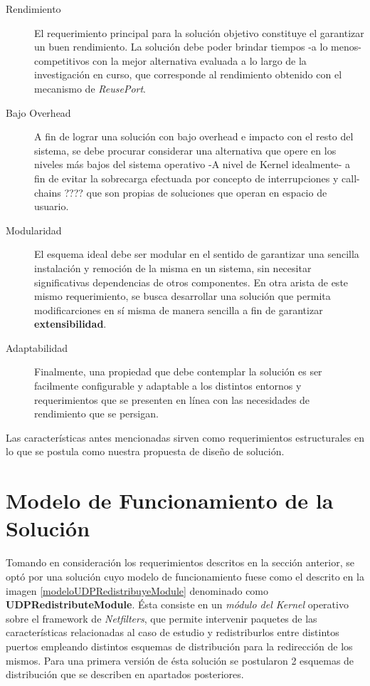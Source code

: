 \begin{description}
\item[Rendimiento] El requerimiento principal para la solución objetivo constituye el garantizar un buen rendimiento. La solución debe poder brindar tiempos -a lo menos- competitivos con la mejor alternativa evaluada a lo largo de la investigación en curso, que corresponde al rendimiento obtenido con el mecanismo de \emph{ReusePort}.
\item[Bajo Overhead] A fin de lograr una solución con bajo overhead e impacto con el resto del sistema, se debe procurar considerar una alternativa que opere en los niveles más bajos del sistema operativo -A nivel de Kernel idealmente- a fin de evitar la sobrecarga efectuada por concepto de interrupciones y call-chains ???? que son propias de soluciones que operan en espacio de usuario.
\item[Modularidad] El esquema ideal debe ser modular en el sentido de garantizar una sencilla instalación y remoción de la misma en un sistema, sin necesitar significativas dependencias de otros componentes. En otra arista de este mismo requerimiento, se busca desarrollar una solución que permita modificarciones en sí misma de manera sencilla a fin de garantizar \textbf{extensibilidad}.
\item[Adaptabilidad] Finalmente, una propiedad que debe contemplar la solución es ser facilmente configurable y adaptable a los distintos entornos y requerimientos que se presenten en línea con las necesidades de rendimiento que se persigan.
\end{description}

Las características antes mencionadas sirven como requerimientos estructurales en lo que se postula como nuestra propuesta de diseño de solución.

\section{Modelo de Funcionamiento de la Solución}
Tomando en consideración los requerimientos descritos en la sección anterior, se optó por una solución cuyo modelo de funcionamiento fuese como el descrito en la imagen \ref{modeloUDPRedistribuyeModule} denominado como \textbf{UDPRedistributeModule}. Ésta consiste en un \emph{módulo del Kernel} operativo sobre el framework de \emph{Netfilters}, que permite intervenir paquetes de las características relacionadas al caso de estudio y redistriburlos entre distintos puertos empleando distintos esquemas de distribución para la redirección de los mismos. Para una primera versión de ésta solución se postularon 2 esquemas de distribución que se describen en apartados posteriores.

